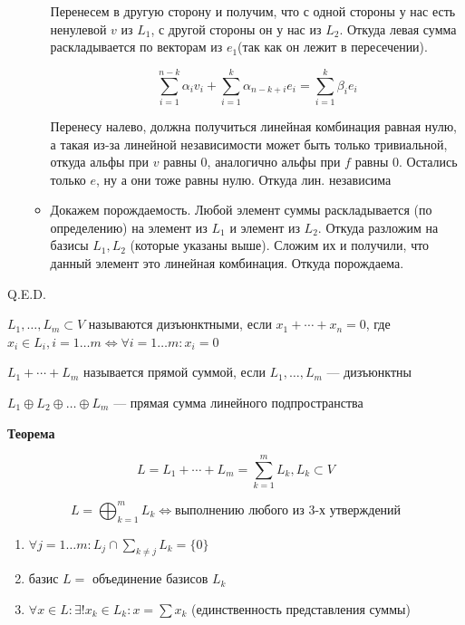 \documentclass[twoside]{book}
\begin{document}
\begin{enumerate}
\begin{itemize}
                    Перенесем в другую сторону и получим, что с одной стороны у нас есть ненулевой $v$ из $L_1$, с другой стороны он у нас из $L_2$. Откуда левая сумма раскладывается по векторам из $e_1$(так как он лежит в пересечении).

                    $$\sum\limits_{i=1}^{n-k} \alpha_i v_i + \sum\limits_{i=1}^{k}\alpha_{n-k+i}e_i = \sum\limits_{i=1}^{k}\beta_{i}e_i$$

                    Перенесу налево, должна получиться линейная комбинация равная нулю, а такая из-за линейной независимости может быть только тривиальной, откуда альфы при $v$ равны 0, аналогично альфы при $f$ равны 0. Остались только $e$, ну а они тоже равны нулю. Откуда лин. независима
              \item Докажем порождаемость. Любой элемент суммы раскладывается (по определению) на элемент из $L_1$ и элемент из $L_2$. Откуда разложим на базисы $L_1,L_2$ (которые указаны выше). Сложим их и получили, что данный элемент это линейная комбинация. Откуда порождаема.
          \end{itemize}

\end{enumerate}



\hfill Q.E.D.

\(L_1, \ldots, L_m \subset V\) называются дизъюнктными, если \(x_1 + \cdots + x_n = 0\), где \(x_i \in L_i, i = 1 \ldots m \Leftrightarrow \forall i = 1 \ldots m: x_i = 0\)

\(L_1 + \cdots + L_m\) называется прямой суммой, если \(L_1, \ldots, L_m\) --- дизъюнктны

\(L_1 \oplus L_2 \oplus \ldots \oplus L_m\) --- прямая сумма линейного подпространства

\textbf{Теорема}

\[
    L = L_1 + \cdots + L_m = \sum\limits_{k = 1}^{m} L_k, L_k \subset V
\]

\[
    L = \bigoplus_{k = 1}^{m} L_k \Leftrightarrow \text{выполнению любого из 3-х утверждений}
\]

\begin{enumerate}
    \item \(\forall j = 1 \ldots m: L_j \cap \sum\limits_{k \neq j} L_k = \{0\}\)

    \item базис \(L = \) объединение базисов \(L_k\)

    \item \(\forall x \in L: \exists! x_k \in L_k: x = \sum\limits x_k\) (единственность представления суммы)
\end{enumerate}
\end{document}
